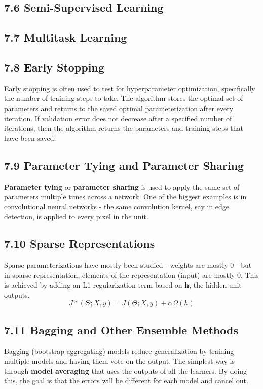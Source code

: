 \documentclass[a4paper]{report}
\begin{document}
\subsection{7.6 Semi-Supervised Learning}
\subsection{7.7 Multitask Learning}
\subsection{7.8 Early Stopping}
Early stopping is often used to test for hyperparameter optimization, specifically the number of training steps to take. The algorithm stores the optimal set of parameters and returns to the saved optimal parameterization after every iteration. If validation error does not decrease after a specified number of iterations, then the algorithm returns the parameters and training steps that have been saved.

\subsection{7.9 Parameter Tying and Parameter Sharing}
\textbf{Parameter tying} or \textbf{parameter sharing} is used to apply the same set of parameters multiple times across a network. One of the biggest examples is in convolutional neural networks - the same convolution kernel, say in edge detection, is applied to every pixel in the unit.

\subsection{7.10 Sparse Representations}
Sparse parameterizations have mostly been studied - weights are mostly 0 - but in sparse representation, elements of the representation (input) are mostly 0. This is achieved by adding an L1 regularization term based on $\textbf{h}$, the hidden unit outputs.
$$J*(\Theta;X,y)=J(\Theta;X,y)+\alpha\Omega(h)$$

\subsection{7.11 Bagging and Other Ensemble Methods}
Bagging (bootstrap aggregating) models reduce generalization by training multiple models and having them vote on the output. The simplest way is through \textbf{model averaging} that uses the outputs of all the learners. By doing this, the goal is that the errors will be different for each model and cancel out.
\end{document}
